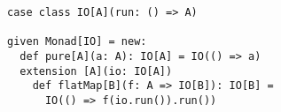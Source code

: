 \begin{algorithm}

\begin{verbatim}
case class IO[A](run: () => A)

given Monad[IO] = new:
  def pure[A](a: A): IO[A] = IO(() => a)
  extension [A](io: IO[A])
    def flatMap[B](f: A => IO[B]): IO[B] =
      IO(() => f(io.run()).run())
\end{verbatim}

\caption{Naive IO monad in Scala %
\label{monad:io}}
\end{algorithm}